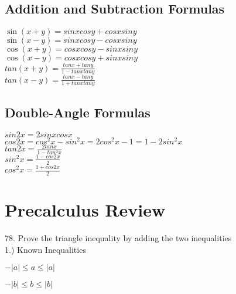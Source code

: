\documentclass{article}
\begin{document}
	\subsection*{Addition and Subtraction Formulas}
		\begin{center}
		$\sin(x + y) = sinxcosy + cosxsiny$\\
		\vspace{10pt}
		$\sin(x - y) = sinxcosy - cosxsiny$\\
		\vspace{10pt}
		$\cos(x + y) = cosxcosy - sinxsiny$\\
		\vspace{10pt}
		$\cos(x - y) = cosxcosy + sinxsiny$\\
		\vspace{10pt}
		$tan(x + y) = \frac{tanx + tany}{1 - tanxtany}$\\
		\vspace{10pt}
		$tan(x - y) = \frac{tanx - tany}{1 + tanxtany}$
		\end{center}
	\subsection*{Double-Angle Formulas}
		\begin{center}
		$sin2x = 2sinxcosx$\\
		\vspace{10pt}
		$cos2x = cos^2x - sin^2x = 2cos^2x-1 = 1-2sin^2x$\\
		\vspace{10pt}
		$tan2x = \frac{2tanx}{1 - tan^2x}$\\
		\vspace{10pt}
		$sin^2x = \frac{1 - cos2x}{2}$\\
		\vspace{10pt}
		$cos^2x = \frac{1+cos2x}{2}$
		\end{center}

\section* {Precalculus Review}

78. Prove the triangle inequality by adding the two inequalities\\

1.) Known Inequalities\\
\begin{center}$-\left|a\right| \leq a \leq \left|a\right|$\\\end{center}
\begin{center}$-\left|b\right| \leq b \leq \left|b\right|$\\\end{center}
\end{document}
